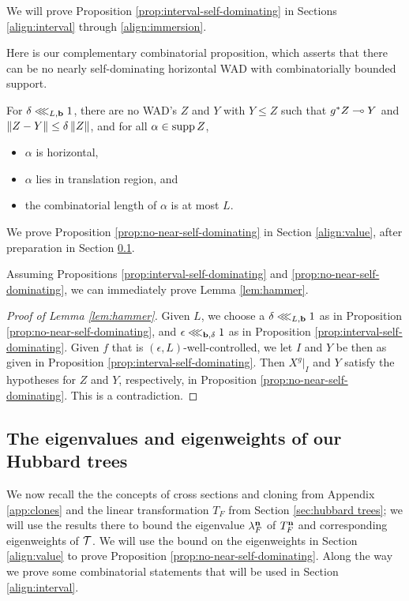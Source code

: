 We will prove Proposition \ref{prop:interval-self-dominating} in Sections \ref{align:interval} through \ref{align:immersion}.

Here is our complementary combinatorial proposition, which asserts that there can be no nearly self-dominating horizontal WAD with combinatorially bounded support. 
\begin{prop} \label{prop:no-near-self-dominating}
For $\delta \lll_{L, \mathbf b} 1$,
there are no WAD's $Z$ and $Y$ with $Y \le Z$ such that 
$g^*Z \multimap Y$ and $\left\Vert Z - Y \right\Vert \le \delta \left\Vert Z \right\Vert$,
and for all $\alpha \in \operatorname{supp} Z$,
\begin{itemize}
\item
$\alpha$ is horizontal,
\item
$\alpha$ lies in translation region, and
\item
the combinatorial length of $\alpha$ is at most $L$.
\end{itemize}
\end{prop}

We prove	Proposition \ref{prop:no-near-self-dominating} in Section \ref{align:value}, 
after preparation in Section \ref{align:Hubbard-weights}.

Assuming Propositions \ref{prop:interval-self-dominating} and \ref{prop:no-near-self-dominating},
we can immediately prove Lemma \ref{lem:hammer}.

\begin{proof}[Proof of Lemma \ref{lem:hammer}]
Given $L$, 
we choose a $\delta \lll_{L, \mathbf b} 1$ as in Proposition \ref{prop:no-near-self-dominating},
and $\epsilon \lll_{\mathbf b, \delta} 1$ as in Proposition \ref{prop:interval-self-dominating}.
Given $f$ that is $(\epsilon, L)$-well-controlled,
we  let $I$ and $Y$ be then as given in Proposition \ref{prop:interval-self-dominating}.
Then $X^g|_I$ and $Y$ satisfy the hypotheses for $Z$ and $Y$, 
respectively,
in Proposition \ref{prop:no-near-self-dominating}.
This is a contradiction.
\end{proof}



\subsection{The eigenvalues and eigenweights of our Hubbard trees} \label{align:Hubbard-weights}
We now recall the the concepts of cross sections and cloning from  Appendix \ref{app:clones}
and the linear transformation $T_F$ from Section \ref{sec:hubbard trees}; we will use the results there to bound the eigenvalue $\lambda_F^{\mathbf{n}}$ of $T_F^{\mathbf{n}}$ and corresponding eigenweights of $\mathcal T$.
We will use the bound on the eigenweights in Section \ref{align:value} to prove Proposition \ref{prop:no-near-self-dominating}.
Along the way we prove some combinatorial statements that will be used in Section \ref{align:interval}. 

